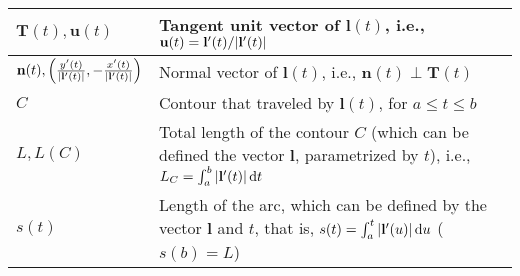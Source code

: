 \documentclass{article}
\begin{document}
\begin{xltabular}{\textwidth}{XX}
	\(\mathbf{T}(t), \mathbf{u}(t)\)                                                                                                                                                                                                           & Tangent unit vector of \(\mathbf{l}(t)\), i.e., \newline  \(\mathbf{u}(t) = \mathbf{l}'(t)/\abs{\mathbf{l}'(t)}\)\cite{stewartCalculus2011,kreyszigAdvancedEngineeringMathematics2008}                                                                  \\ \hline
	\(\mathbf{n}(t), \left( \frac{y'(t)}{\abs{\mathbf{l}'(t)}}, -\frac{x'(t)}{\abs{\mathbf{l}'(t)}} \right)\)                                                                                                                                  & Normal vector of \(\mathbf{l}(t)\), i.e., \newline \(\mathbf{n}(t)\perp \mathbf{T}(t) \)\cite{stewartCalculus2011}                                                                                                                                      \\ \hline
	\(C\)                                                                                                                                                                                                                                      & Contour that traveled by \(\mathbf{l}(t)\), for \(a \leq t \leq b\) \cite{stewartCalculus2011}                                                                                                                                                          \\ \hline
	\(L, L(C)\)                                                                                                                                                                                                                                & Total length of the contour \(C\) (which can be defined the vector \(\mathbf{l}\), parametrized by \(t\)), i.e., \(L_C = \int_a^b \abs{\mathbf{l}'(t)} \dd{t}\)\cite{stewartCalculus2011}                                                               \\ \hline
	\(s(t)\)                                                                                                                                                                                                                                   & Length of the arc, which can be defined by the vector \(\mathbf{l}\) and \(t\), that is, \(s(t) = \int_a^t \abs{\mathbf{l}'(u)} \dd{u}\) (\(s(b) = L\))\cite{stewartCalculus2011}                                                                       \\ \hline

\end{xltabular}
\end{document}
